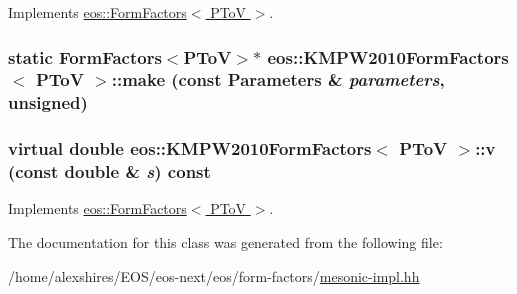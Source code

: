 Implements \hyperlink{classeos_1_1FormFactors_3_01PToV_01_4_adf8b5d0a879693460aa67feec257c959}{eos::FormFactors$<$ PToV $>$}.\hypertarget{classeos_1_1KMPW2010FormFactors_3_01PToV_01_4_a7b2c91918ff4cc0ed6a48ba58b24d398}{
\subsubsection[{make}]{\setlength{\rightskip}{0pt plus 5cm}static FormFactors$<${\bf PToV}$>$$\ast$ eos::KMPW2010FormFactors$<$ {\bf PToV} $>$::make (const {\bf Parameters} \& {\em parameters}, \/  unsigned)}}
\label{classeos_1_1KMPW2010FormFactors_3_01PToV_01_4_a7b2c91918ff4cc0ed6a48ba58b24d398}
\hypertarget{classeos_1_1KMPW2010FormFactors_3_01PToV_01_4_a18116140dccb14f0be2892051487e39b}{
\subsubsection[{v}]{\setlength{\rightskip}{0pt plus 5cm}virtual double eos::KMPW2010FormFactors$<$ {\bf PToV} $>$::v (const double \& {\em s}) const}}
\label{classeos_1_1KMPW2010FormFactors_3_01PToV_01_4_a18116140dccb14f0be2892051487e39b}


Implements \hyperlink{classeos_1_1FormFactors_3_01PToV_01_4_a1a76e6a00b424994b0b4eb86b4a8131f}{eos::FormFactors$<$ PToV $>$}.

The documentation for this class was generated from the following file:\begin{DoxyCompactItemize}
\item 
/home/alexshires/EOS/eos-\/next/eos/form-\/factors/\hyperlink{mesonic-impl_8hh}{mesonic-\/impl.hh}\end{DoxyCompactItemize}
